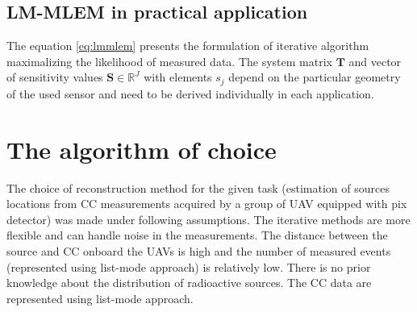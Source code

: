 \subsection{LM-MLEM in practical application}
The equation \ref{eq:lmmlem} presents the formulation of iterative algorithm maximalizing the likelihood of measured data.
The system matrix $\mathbf{T}$ and vector of sensitivity values $\mathbf{S} \in \mathbb{R}^{J}$ with elements $s_{j}$ depend on the particular geometry of the used sensor and need to be derived individually in each application.





\section{The algorithm of choice}
The choice of reconstruction method for the given task (estimation of sources locations from \ac{CC} measurements acquired by a group of \ac{UAV} equipped with \ac{pix} detector) was made under following assumptions.
The iterative methods are more flexible and can handle noise in the measurements.
The distance between the source and \ac{CC} onboard the \ac{UAV}s is high and the number of measured events (represented using list-mode approach) is relatively low.
There is no prior knowledge about the distribution of radioactive sources.
The \ac{CC} data are represented using list-mode approach.


